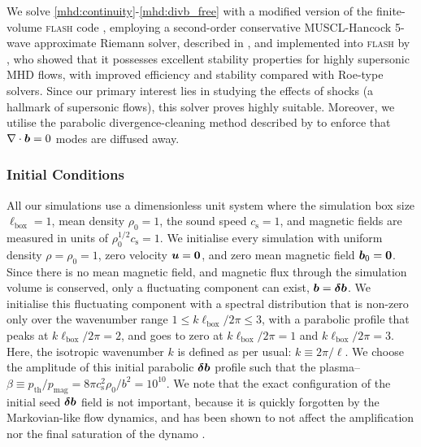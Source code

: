 We solve \autoref{mhd:continuity}-\ref{mhd:divb_free} with a modified version of the finite-volume \textsc{flash} code \citep{fryxell2000flash, dubey2008introduction}, employing a second-order conservative MUSCL-Hancock 5-wave approximate Riemann solver, described in \citet{bouchut2007multiwave, bouchut2010multiwave}, and implemented into \textsc{flash} by \citet{waagan2011robust}, who showed that it possesses excellent stability properties for highly supersonic MHD flows, with improved efficiency and stability compared with Roe-type solvers. Since our primary interest lies in studying the effects of shocks (a hallmark of supersonic flows), this solver proves highly suitable. Moreover, we utilise the parabolic divergence-cleaning method described by \citet{Marder1987_fluxcleaning} to enforce that $\nabla\cdot\bm{b} = 0$ modes are diffused away.

\subsubsection{Initial Conditions}

All our simulations use a dimensionless unit system where the simulation box size $\ell_\mathrm{box} = 1$, mean density $\rho_0 = 1$, the sound speed $c_\mathrm{s} = 1$, and magnetic fields are measured in units of $\rho_0^{1/2} c_\mathrm{s} = 1$. We initialise every simulation with uniform density $\rho = \rho_0 = 1$, zero velocity $\bm{u} = \bm{0}$, and zero mean magnetic field $\bm{b}_0 = \bm{0}$. Since there is no mean magnetic field, and magnetic flux through the simulation volume is conserved, only a fluctuating component can exist, $\bm{b} = \bm{\delta b}$. We initialise this fluctuating component with a spectral distribution \citep[using \mbox{\textsc{TurbGen}};][]{Federrath2022_TurbGen} that is non-zero only over the wavenumber range $1 \leq k \ell_\mathrm{box} / 2\pi \leq 3$, with a parabolic profile that peaks at $k \ell_\mathrm{box}/2\pi = 2$, and goes to zero at $k \ell_\mathrm{box}/2\pi = 1$ and $k \ell_\mathrm{box}/2\pi = 3$. Here, the isotropic wavenumber $k$ is defined as per usual: $k \equiv 2\pi / \ell$. We choose the amplitude of this initial parabolic $\bm{\delta b}$ profile such that the plasma--$\beta \equiv p_\mathrm{th}/p_\mathrm{mag} = 8\pi c_\mathrm{s}^2 \rho_0 / b^2 = 10^{10}$. We note that the exact configuration of the initial seed $\bm{\delta b}$ field is not important, because it is quickly forgotten by the Markovian-like flow dynamics, and has been shown to not affect the amplification nor the final saturation of the dynamo \citep{seta2020seed, bott2022insensitivity, beattie2022growth}.

